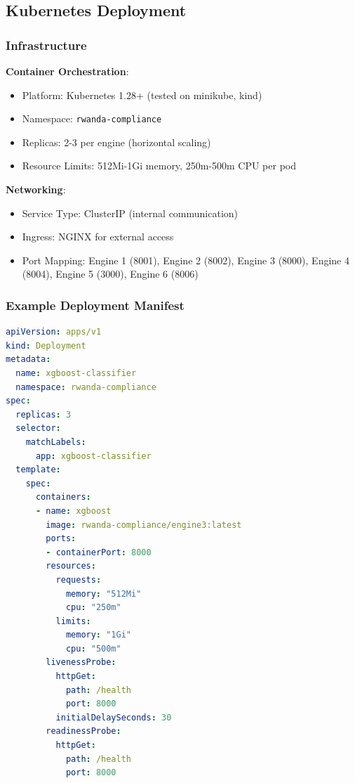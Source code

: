 \documentclass[11pt,conference]{IEEEtran}
\begin{document}
\subsection{Kubernetes Deployment}

\subsubsection{Infrastructure}

\textbf{Container Orchestration}:
\begin{itemize}
    \item Platform: Kubernetes 1.28+ (tested on minikube, kind)
    \item Namespace: \texttt{rwanda-compliance}
    \item Replicas: 2-3 per engine (horizontal scaling)
    \item Resource Limits: 512Mi-1Gi memory, 250m-500m CPU per pod
\end{itemize}

\textbf{Networking}:
\begin{itemize}
    \item Service Type: ClusterIP (internal communication)
    \item Ingress: NGINX for external access
    \item Port Mapping: Engine 1 (8001), Engine 2 (8002), Engine 3 (8000), Engine 4 (8004), Engine 5 (3000), Engine 6 (8006)
\end{itemize}

\subsubsection{Example Deployment Manifest}

\begin{lstlisting}[language=yaml]
apiVersion: apps/v1
kind: Deployment
metadata:
  name: xgboost-classifier
  namespace: rwanda-compliance
spec:
  replicas: 3
  selector:
    matchLabels:
      app: xgboost-classifier
  template:
    spec:
      containers:
      - name: xgboost
        image: rwanda-compliance/engine3:latest
        ports:
        - containerPort: 8000
        resources:
          requests:
            memory: "512Mi"
            cpu: "250m"
          limits:
            memory: "1Gi"
            cpu: "500m"
        livenessProbe:
          httpGet:
            path: /health
            port: 8000
          initialDelaySeconds: 30
        readinessProbe:
          httpGet:
            path: /health
            port: 8000
\end{lstlisting}
\end{document}

